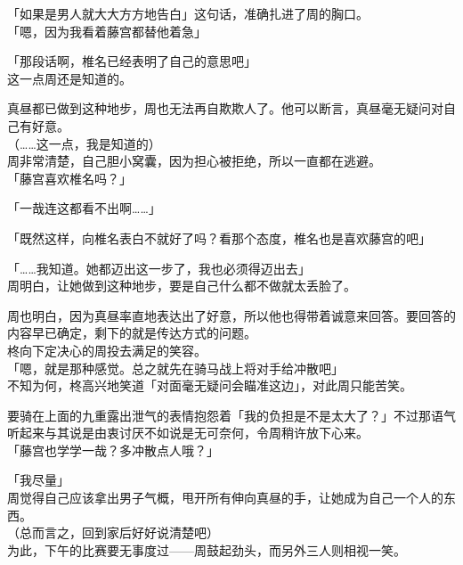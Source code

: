 「如果是男人就大大方方地告白」这句话，准确扎进了周的胸口。\\

「嗯，因为我看着藤宫都替他着急」

「那段话啊，椎名已经表明了自己的意思吧」\\

这一点周还是知道的。

真昼都已做到这种地步，周也无法再自欺欺人了。他可以断言，真昼毫无疑问对自己有好意。\\

（……这一点，我是知道的）\\

周非常清楚，自己胆小窝囊，因为担心被拒绝，所以一直都在逃避。\\

「藤宫喜欢椎名吗？」

「一哉连这都看不出啊……」

「既然这样，向椎名表白不就好了吗？看那个态度，椎名也是喜欢藤宫的吧」

「……我知道。她都迈出这一步了，我也必须得迈出去」\\

周明白，让她做到这种地步，要是自己什么都不做就太丢脸了。

周也明白，因为真昼率直地表达出了好意，所以他也得带着诚意来回答。要回答的内容早已确定，剩下的就是传达方式的问题。\\

柊向下定决心的周投去满足的笑容。\\

「嗯，就是那种感觉。总之就先在骑马战上将对手给冲散吧」\\

不知为何，柊高兴地笑道「对面毫无疑问会瞄准这边」，对此周只能苦笑。

要骑在上面的九重露出泄气的表情抱怨着「我的负担是不是太大了？」不过那语气听起来与其说是由衷讨厌不如说是无可奈何，令周稍许放下心来。\\

「藤宫也学学一哉？多冲散点人哦？」

「我尽量」\\

周觉得自己应该拿出男子气概，甩开所有伸向真昼的手，让她成为自己一个人的东西。\\

（总而言之，回到家后好好说清楚吧）\\

为此，下午的比赛要无事度过——周鼓起劲头，而另外三人则相视一笑。
